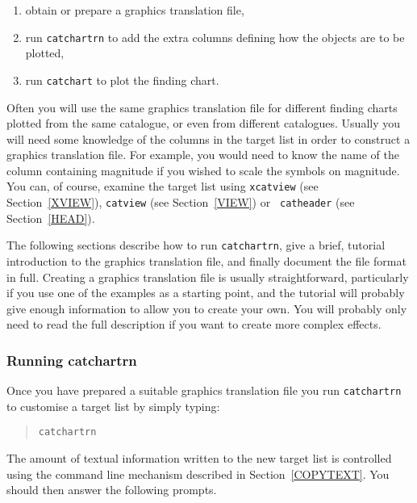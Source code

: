 \documentclass[twoside,11pt]{article}
\renewcommand{\_}{\texttt{\symbol{95}}}
\begin{document}
\begin{enumerate}

  \item obtain or prepare a graphics translation file,

  \item run {\tt catchartrn} to add the extra columns defining how
   the objects are to be plotted,

  \item run {\tt catchart} to plot the finding chart.

\end{enumerate}

Often you will use the same graphics translation file for different
finding charts plotted from the same catalogue, or even from different
catalogues.  Usually you will need some knowledge of the columns in
the target list in order to construct a graphics translation file.
For example, you would need to know the name of the column containing
magnitude if you wished to scale the symbols on magnitude.  You can, of
course, examine the target list using {\tt xcatview} (see
Section~\ref{XVIEW}), {\tt catview} (see Section~\ref{VIEW}) or {\tt
catheader} (see Section~\ref{HEAD}).

The following sections describe how to run {\tt catchartrn}, give a brief,
tutorial introduction to the graphics translation file, and finally
document the file format in full.  Creating a graphics translation file is
usually straightforward, particularly if you use one of the examples as a
starting point, and the tutorial will probably give enough information to
allow you to create your own.  You will probably only need to read the
full description if you want to create more complex effects.

\subsubsection{\label{RCATCHARTRN}Running catchartrn}

Once you have prepared a suitable graphics translation file you run
{\tt catchartrn} to customise a target list by simply typing:

\begin{verse}
{\tt catchartrn}
\end{verse}

The amount of textual information written to the new target list is
controlled using the command line mechanism described in
Section~\ref{COPYTEXT}.  You should then answer the following prompts.
\end{document}
